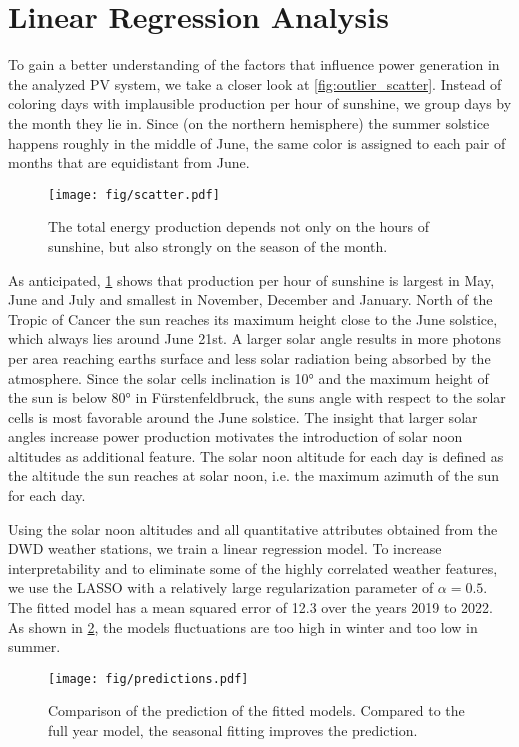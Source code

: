 \documentclass{article}
\begin{document}
\section{Linear Regression Analysis}
To gain a better understanding of the factors that influence power generation in the analyzed PV system, we take a closer look at \ref{fig:outlier_scatter}. Instead of coloring days with implausible production per hour of sunshine, we group days by the month they lie in. Since (on the northern hemisphere) the summer solstice happens roughly in the middle of June, the same color is assigned to each pair of months that are equidistant from June.

\begin{figure}
	\texttt{[image: fig/scatter.pdf]}
	\caption{The total energy production depends not only on the hours of sunshine, but also strongly on the season of the month.}\label{fig:scatter_months}
\end{figure}

As anticipated, \ref{fig:scatter_months} shows that production per hour of sunshine is largest in May, June and July and smallest in November, December and January. North of the Tropic of Cancer the sun reaches its maximum height close to the June solstice, which always lies around June 21st. A larger solar angle results in more photons per area reaching earths surface and less solar radiation being absorbed by the atmosphere. Since the solar cells inclination is 10° and the maximum height of the sun is below 80° in Fürstenfeldbruck, the suns angle with respect to the solar cells is most favorable around the June solstice. The insight that larger solar angles increase power production motivates the introduction of solar noon altitudes as additional feature. The solar noon altitude for each day is defined as the altitude the sun reaches at solar noon, i.e. the maximum azimuth of the sun for each day.

Using the solar noon altitudes and all quantitative attributes obtained from the DWD weather stations, we train a linear regression model. To increase interpretability and to eliminate some of the highly correlated weather features, we use the LASSO with a relatively large regularization parameter of $\alpha = 0.5$. The fitted model has a mean squared error of 12.3 over the years 2019 to 2022. As shown in \ref{fig:predictions}, the models fluctuations are too high in winter and too low in summer.

\begin{figure}
	\texttt{[image: fig/predictions.pdf]}
	\caption{Comparison of the prediction of the fitted models. Compared to the full year model, the seasonal fitting improves the prediction.}\label{fig:predictions}
\end{figure}
\end{document}

